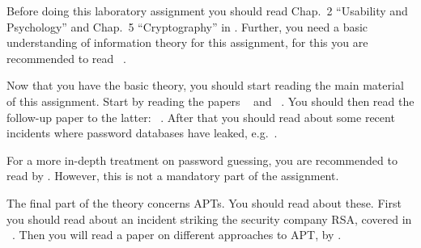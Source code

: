 Before doing this laboratory assignment you should read Chap.~2 ``Usability and 
Psychology'' and Chap.~5 ``Cryptography'' in  
\cite{Anderson2008sea}.
Further, you need a basic understanding of information theory 
\cite{Shannon1948amt} for this assignment, for this you are recommended to read 
~\cite{Ueltschi2013se}.

Now that you have the basic theory, you should start reading the main material 
of this assignment.
Start by reading the papers ~\cite{Kuo2006hso} and 
~\cite{Komanduri2011opa}.
You should then read the follow-up paper to the latter: 
~\cite{Komanduri2014can}.
After that you should read about some recent incidents where password databases 
have leaked, 
e.g.~\cite{Hunt2011abs,Cluley2012twp,Oberheide2010bao,Cubrilovic2009rhf}.

For a more in-depth treatment on password guessing, you are recommended to read 
 by \citet{Bonneau2012ghs}.
However, this is not a mandatory part of the assignment.

The final part of the theory concerns \acp{APT}.
You should read about these.
First you should read about an incident striking the security company RSA, 
covered in ~\cite{Fisher2011rsa}.
Then you will read a paper on different approaches to \ac{APT}, 
 by \citet{Juels2012sha}.
